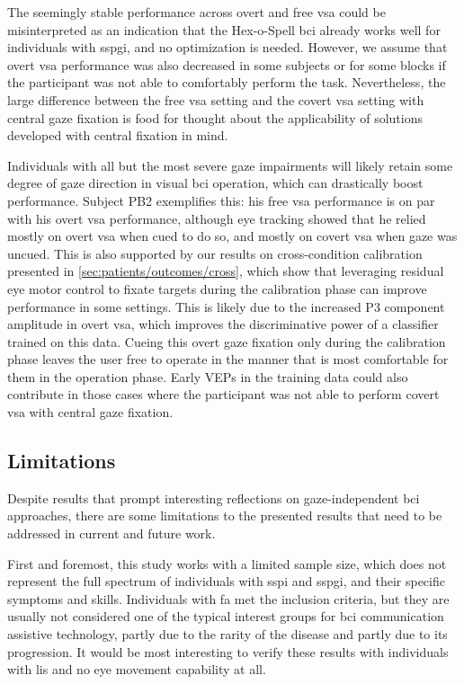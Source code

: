 The seemingly stable performance across overt and free \ac{vsa} could be
misinterpreted as an indication that the Hex-o-Spell \ac{bci} already works
well for individuals with \ac{sspgi}, and no optimization is
needed.
However, we assume that overt \ac{vsa} performance was also decreased in some
subjects or for some blocks if the participant was not able to comfortably
perform the task.
Nevertheless, the large difference between the free \ac{vsa} setting and the
covert \ac{vsa} setting
with central gaze fixation is food for thought about the applicability of
solutions developed with central fixation in mind.

Individuals with all but the most severe gaze impairments will likely retain
some degree of gaze direction in visual \ac{bci} operation, which can
drastically boost performance.
Subject PB2 exemplifies this: his free \ac{vsa} performance is on par with his
overt \ac{vsa} performance, although eye tracking showed that he relied mostly
on overt \ac{vsa} when cued to do so, and mostly on covert \ac{vsa} when
gaze was uncued.
This is also supported by our results on cross-condition calibration presented
in \cref{sec:patients/outcomes/cross}, which show that leveraging residual
eye motor control to fixate targets during the calibration phase can improve
performance in some settings.
This is likely due to the increased P3 component amplitude in overt \ac{vsa},
which improves the discriminative power of a classifier trained on this data.
Cueing this overt gaze fixation only during the calibration phase leaves the user
free to operate in the manner that is most comfortable for them in the
operation phase.
Early VEPs in the training data could also contribute in those cases where the participant was not
able to perform covert \ac{vsa} with central gaze fixation.

\subsection{Limitations}

Despite results that prompt interesting reflections on gaze-independent \ac{bci} approaches,
there are some limitations to the presented results that need to be
addressed in current and future work.

First and foremost, this study works with a limited sample size, which
does not represent the full spectrum of individuals with \ac{sspi} and
\ac{sspgi}, and their specific symptoms and skills.
Individuals with \ac{fa} met the inclusion criteria, but they are usually not
considered one of the typical interest groups for \ac{bci} communication assistive
technology, partly due to the rarity of the disease and partly due to its
progression.
It would be most interesting to verify these results with individuals with
\ac{lis} and no eye movement capability at all.

